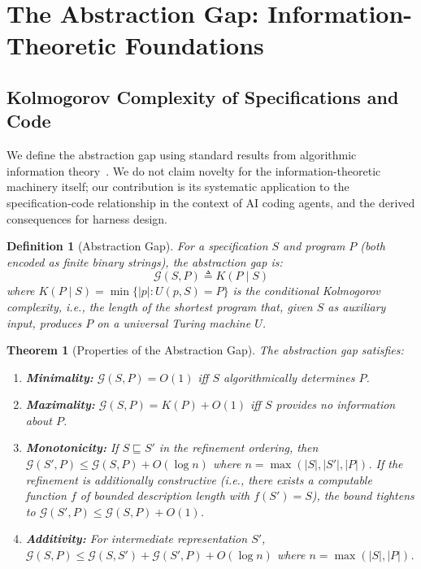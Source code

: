 \documentclass[11pt, a4paper, logo, copyright]{googledeepmind}
\newtheorem{definition}{Definition}[section]
\newtheorem{theorem}{Theorem}[section]
\begin{document}
\section{The Abstraction Gap: Information-Theoretic Foundations}
\label{sec:information-theory}

\subsection{Kolmogorov Complexity of Specifications and Code}

We define the abstraction gap using standard results from algorithmic information theory~\citep{kolmogorov1965three, chaitin1966length, li2019introduction}. We do not claim novelty for the information-theoretic machinery itself; our contribution is its systematic application to the specification-code relationship in the context of AI coding agents, and the derived consequences for harness design.

\begin{definition}[Abstraction Gap]
For a specification $S$ and program $P$ (both encoded as finite binary strings), the \emph{abstraction gap} is:
\begin{equation}
    \mathcal{G}(S, P) \triangleq K(P \mid S)
\end{equation}
where $K(P \mid S) = \min\{|p| : U(p, S) = P\}$ is the conditional Kolmogorov complexity, i.e., the length of the shortest program that, given $S$ as auxiliary input, produces $P$ on a universal Turing machine $U$.
\end{definition}

\begin{theorem}[Properties of the Abstraction Gap]
\label{thm:gap-properties}
The abstraction gap satisfies:
\begin{enumerate}
    \item \textbf{Minimality:} $\mathcal{G}(S, P) = O(1)$ iff $S$ algorithmically determines $P$.
    \item \textbf{Maximality:} $\mathcal{G}(S, P) = K(P) + O(1)$ iff $S$ provides no information about $P$.
    \item \textbf{Monotonicity:} If $S \sqsubseteq S'$ in the refinement ordering, then $\mathcal{G}(S', P) \leq \mathcal{G}(S, P) + O(\log n)$ where $n = \max(|S|, |S'|, |P|)$. If the refinement is additionally \emph{constructive} (i.e., there exists a computable function $f$ of bounded description length with $f(S') = S$), the bound tightens to $\mathcal{G}(S', P) \leq \mathcal{G}(S, P) + O(1)$.
    \item \textbf{Additivity:} For intermediate representation $S'$, $\mathcal{G}(S, P) \leq \mathcal{G}(S, S') + \mathcal{G}(S', P) + O(\log n)$ where $n = \max(|S|, |P|)$.
\end{enumerate}
\end{theorem}
\end{document}
